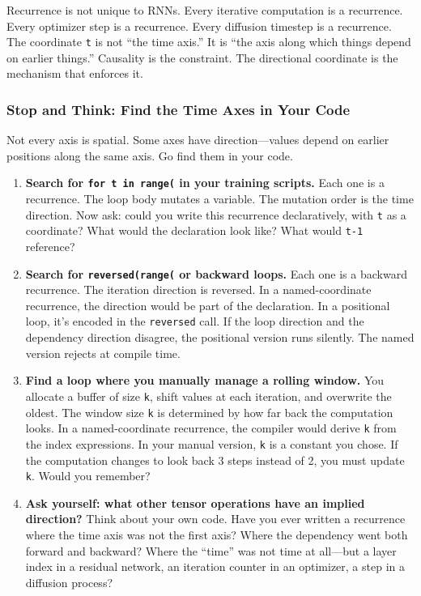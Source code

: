\documentclass[11pt,titlepage]{article}
\begin{document}
Recurrence is not unique to RNNs. Every iterative computation is a
recurrence. Every optimizer step is a recurrence. Every diffusion
timestep is a recurrence. The coordinate \texttt{t} is not ``the time
axis.'' It is ``the axis along which things depend on earlier things.''
Causality is the constraint. The directional coordinate is the mechanism
that enforces it.

\vspace{2em}

\hypertarget{stop-and-think-find-the-time-axes-in-your-code}{%
\subsubsection{Stop and Think: Find the Time Axes in Your
Code}\label{stop-and-think-find-the-time-axes-in-your-code}}

Not every axis is spatial. Some axes have direction---values depend on
earlier positions along the same axis. Go find them in your code.

\begin{enumerate}
\def\labelenumi{\arabic{enumi}.}
\item
  \textbf{Search for \texttt{for\ t\ in\ range(} in your training
  scripts.} Each one is a recurrence. The loop body mutates a variable.
  The mutation order is the time direction. Now ask: could you write
  this recurrence declaratively, with \texttt{t} as a coordinate? What
  would the declaration look like? What would \texttt{t-1} reference?
\item
  \textbf{Search for \texttt{reversed(range(} or backward loops.} Each
  one is a backward recurrence. The iteration direction is reversed. In
  a named-coordinate recurrence, the direction would be part of the
  declaration. In a positional loop, it's encoded in the
  \texttt{reversed} call. If the loop direction and the dependency
  direction disagree, the positional version runs silently. The named
  version rejects at compile time.
\item
  \textbf{Find a loop where you manually manage a rolling window.} You
  allocate a buffer of size \texttt{k}, shift values at each iteration,
  and overwrite the oldest. The window size \texttt{k} is determined by
  how far back the computation looks. In a named-coordinate recurrence,
  the compiler would derive \texttt{k} from the index expressions. In
  your manual version, \texttt{k} is a constant you chose. If the
  computation changes to look back 3 steps instead of 2, you must update
  \texttt{k}. Would you remember?
\item
  \textbf{Ask yourself: what other tensor operations have an implied
  direction?} Think about your own code. Have you ever written a
  recurrence where the time axis was not the first axis? Where the
  dependency went both forward and backward? Where the ``time'' was not
  time at all---but a layer index in a residual network, an iteration
  counter in an optimizer, a step in a diffusion process?
\end{enumerate}
\end{document}
